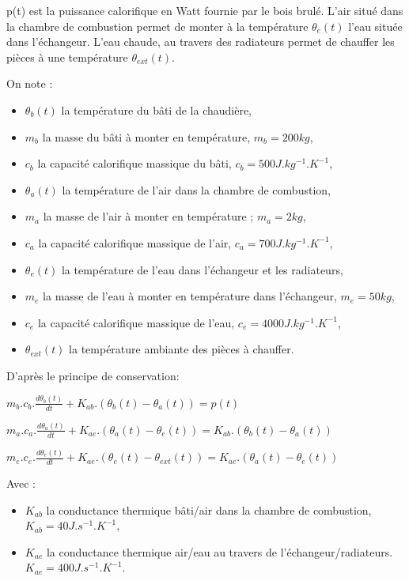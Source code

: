 p(t) est la puissance calorifique en Watt fournie par le bois brulé. L'air situé dans la chambre de combustion permet de monter à la température $\theta_e(t)$ l'eau située dans l'échangeur. L'eau chaude, au travers des radiateurs permet de chauffer les pièces à une température $\theta_{ext}(t)$.

On note :
\begin{itemize}
 \item $\theta_b(t)$ la température du bâti de la chaudière,
 \item $m_b$ la masse du bâti à monter en température, $m_b=200kg$,
 \item $c_b$ la capacité calorifique massique du bâti, $c_b=500J.kg^{-1}.K^{-1}$,
 \item $\theta_a(t)$ la température de l'air dans la chambre de combustion,
 \item $m_a$ la masse de l'air à monter en température ; $m_a=2kg$,
 \item $c_a$ la capacité calorifique massique de l'air, $c_a=700J.kg^{-1}.K^{-1}$,
 \item $\theta_e(t)$ la température de l'eau dans l'échangeur et les radiateurs,
 \item $m_e$ la masse de l'eau à monter en température dans l'échangeur, $m_e=50kg$,
 \item $c_e$ la capacité calorifique massique de l'eau, $c_e=4000J.kg^{-1}.K^{-1}$,
 \item $\theta_{ext}(t)$ la température ambiante des pièces à chauffer.
\end{itemize}

D'après le principe de conservation:

$m_b.c_b.\frac{d\theta_b(t)}{dt}+K_{ab}.(\theta_b(t)-\theta_a(t))=p(t)$

$m_a.c_a.\frac{d\theta_a(t)}{dt}+K_{ae}.(\theta_a(t)-\theta_e(t))=K_{ab}.(\theta_b(t)-\theta_a(t))$

$m_e.c_e.\frac{d\theta_e(t)}{dt}+K_{ae}.(\theta_e(t)-\theta_{ext}(t))=K_{ae}.(\theta_a(t)-\theta_e(t))$

Avec :
\begin{itemize}
 \item $K_{ab}$ la conductance thermique bâti/air dans la chambre de combustion, $K_{ab}=40 J.s^{-1}.K^{-1}$,
 \item $K_{ae}$ la conductance thermique air/eau au travers de l'échangeur/radiateurs. $K_{ae}=400 J.s^{-1}.K^{-1}$.
\end{itemize}

